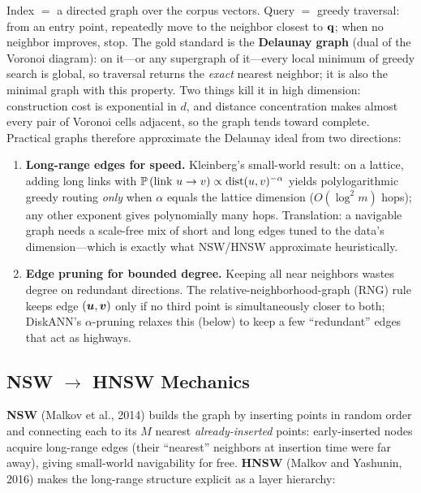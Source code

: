 Index $=$ a directed graph over the corpus vectors. Query $=$ greedy traversal: from an entry point, repeatedly move to the neighbor closest to $\mathbf{q}$; when no neighbor improves, stop. The gold standard is the \textbf{Delaunay graph} (dual of the Voronoi diagram): on it---or any supergraph of it---every local minimum of greedy search is global, so traversal returns the \emph{exact} nearest neighbor; it is also the minimal graph with this property. Two things kill it in high dimension: construction cost is exponential in $d$, and distance concentration makes almost every pair of Voronoi cells adjacent, so the graph tends toward complete. Practical graphs therefore approximate the Delaunay ideal from two directions:
\begin{enumerate}
    \item \textbf{Long-range edges for speed.} Kleinberg's small-world result: on a lattice, adding long links with $\mathbb{P}\left(\text{link } u \to v\right) \propto \operatorname{dist}(u,v)^{-\alpha}$ yields polylogarithmic greedy routing \emph{only} when $\alpha$ equals the lattice dimension ($O(\log^2 m)$ hops); any other exponent gives polynomially many hops. Translation: a navigable graph needs a scale-free mix of short and long edges tuned to the data's dimension---which is exactly what NSW/HNSW approximate heuristically.
    \item \textbf{Edge pruning for bounded degree.} Keeping all near neighbors wastes degree on redundant directions. The relative-neighborhood-graph (RNG) rule keeps edge $(\bm{u},\bm{v})$ only if no third point is simultaneously closer to both; DiskANN's $\alpha$-pruning relaxes this (below) to keep a few ``redundant'' edges that act as highways.
\end{enumerate}

\subsection{NSW $\to$ HNSW Mechanics}

\textbf{NSW} (Malkov et al., 2014) builds the graph by inserting points in random order and connecting each to its $M$ nearest \emph{already-inserted} points: early-inserted nodes acquire long-range edges (their ``nearest'' neighbors at insertion time were far away), giving small-world navigability for free. \textbf{HNSW} (Malkov and Yashunin, 2016) makes the long-range structure explicit as a layer hierarchy:

